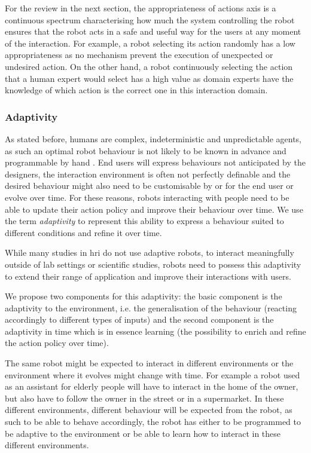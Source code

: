     For the review in the next section, the appropriateness of actions axis is a continuous spectrum characterising how much the system controlling the robot ensures that the robot acts in a safe and useful way for the users at any moment of the interaction. For example, a robot selecting its action randomly has a low appropriateness as no mechanism prevent the execution of unexpected or undesired action. On the other hand, a robot continuously selecting the action that a human expert would select has a high value as domain experts have the knowledge of which action is the correct one in this interaction domain.


\subsubsection{Adaptivity}	\label{ssec:adap}
    As stated before, humans are complex, indeterministic and unpredictable agents, as such an optimal robot behaviour is not likely to be known in advance and programmable by hand \citep{dautenhahn2004robots,argall2009survey}. End users will express behaviours not anticipated by the designers, the interaction environment is often not perfectly definable and the desired behaviour might also need to be customisable by or for the end user or evolve over time. For these reasons, robots interacting with people need to be able to update their action policy and improve their behaviour over time. We use the term \emph{adaptivity} to represent this ability to express a behaviour suited to different conditions and refine it over time. 
    
    While many studies in \gls{hri} do not use adaptive robots, to interact meaningfully outside of lab settings or scientific studies, robots need to possess this adaptivity to extend their range of application and improve their interactions with users.  
    
    We propose two components for this adaptivity: the basic component is the adaptivity to the environment, i.e. the generalisation of the behaviour (reacting accordingly to different types of inputs) and the second component is the adaptivity in time which is in essence learning (the possibility to enrich and refine the action policy over time). 
	
    The same robot might be expected to interact in different environments or the environment where it evolves might change with time. For example a robot used as an assistant for elderly people will have to interact in the home of the owner, but also have to follow the owner in the street or in a supermarket. In these different environments, different behaviour will be expected from the robot, as such to be able to behave accordingly, the robot has either to be programmed to be adaptive to the environment or be able to learn how to interact in these different environments.

